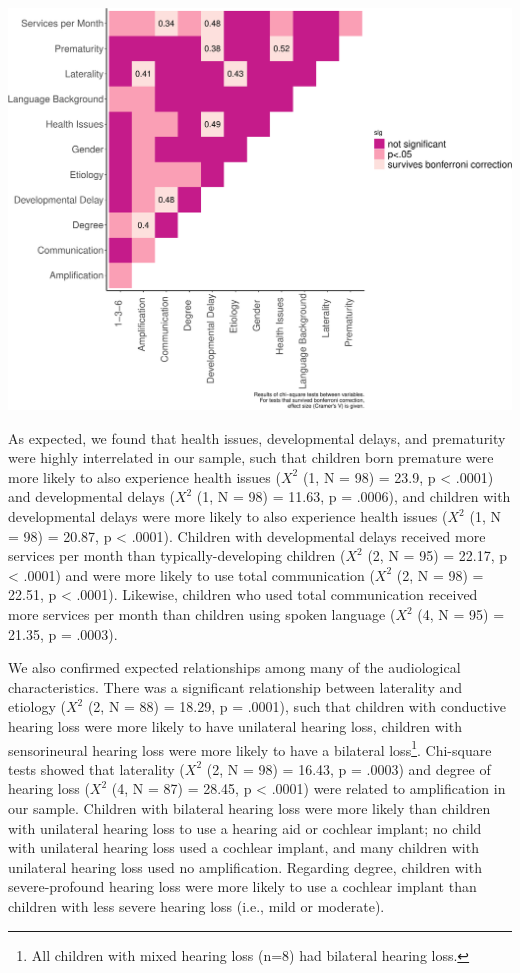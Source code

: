 \documentclass[english,man]{apa6}
\begin{document}
\includegraphics{ELSSP_paper_files/figure-latex/relationships-plot-1.pdf}

As expected, we found that health issues, developmental delays, and prematurity were highly interrelated in our sample, such that children born premature were more likely to also experience health issues (\(X^2\) (1, N = 98) = 23.9, p \textless{} .0001) and developmental delays (\(X^2\) (1, N = 98) = 11.63, p = .0006), and children with developmental delays were more likely to also experience health issues (\(X^2\) (1, N = 98) = 20.87, p \textless{} .0001). Children with developmental delays received more services per month than typically-developing children (\(X^2\) (2, N = 95) = 22.17, p \textless{} .0001) and were more likely to use total communication (\(X^2\) (2, N = 98) = 22.51, p \textless{} .0001). Likewise, children who used total communication received more services per month than children using spoken language (\(X^2\) (4, N = 95) = 21.35, p = .0003).

We also confirmed expected relationships among many of the audiological characteristics. There was a significant relationship between laterality and etiology (\(X^2\) (2, N = 88) = 18.29, p = .0001), such that children with conductive hearing loss were more likely to have unilateral hearing loss, children with sensorineural hearing loss were more likely to have a bilateral loss\footnote{All children with mixed hearing loss (n=8) had bilateral hearing loss.}. Chi-square tests showed that laterality (\(X^2\) (2, N = 98) = 16.43, p = .0003) and degree of hearing loss (\(X^2\) (4, N = 87) = 28.45, p \textless{} .0001) were related to amplification in our sample. Children with bilateral hearing loss were more likely than children with unilateral hearing loss to use a hearing aid or cochlear implant; no child with unilateral hearing loss used a cochlear implant, and many children with unilateral hearing loss used no amplification. Regarding degree, children with severe-profound hearing loss were more likely to use a cochlear implant than children with less severe hearing loss (i.e., mild or moderate).
\end{document}
